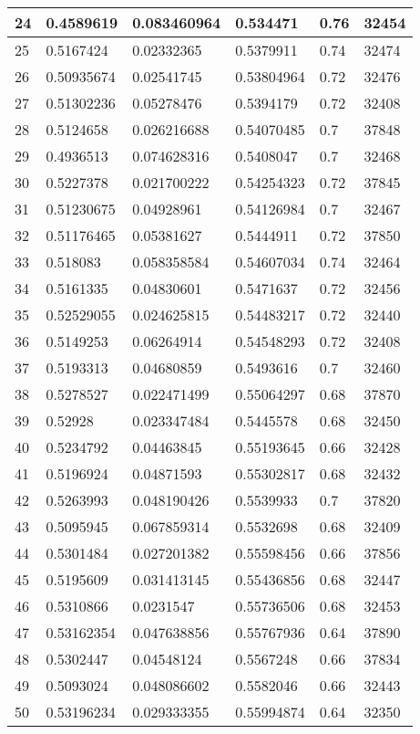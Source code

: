 \begin{longtable}{|l|l|l|l|l|l|}
24 & 0.4589619 & 0.083460964 & 0.534471 & 0.76 & 32454 \\ \hline 
25 & 0.5167424 & 0.02332365 & 0.5379911 & 0.74 & 32474 \\ \hline 
26 & 0.50935674 & 0.02541745 & 0.53804964 & 0.72 & 32476 \\ \hline 
27 & 0.51302236 & 0.05278476 & 0.5394179 & 0.72 & 32408 \\ \hline 
28 & 0.5124658 & 0.026216688 & 0.54070485 & 0.7 & 37848 \\ \hline 
29 & 0.4936513 & 0.074628316 & 0.5408047 & 0.7 & 32468 \\ \hline 
30 & 0.5227378 & 0.021700222 & 0.54254323 & 0.72 & 37845 \\ \hline 
31 & 0.51230675 & 0.04928961 & 0.54126984 & 0.7 & 32467 \\ \hline 
32 & 0.51176465 & 0.05381627 & 0.5444911 & 0.72 & 37850 \\ \hline 
33 & 0.518083 & 0.058358584 & 0.54607034 & 0.74 & 32464 \\ \hline 
34 & 0.5161335 & 0.04830601 & 0.5471637 & 0.72 & 32456 \\ \hline 
35 & 0.52529055 & 0.024625815 & 0.54483217 & 0.72 & 32440 \\ \hline 
36 & 0.5149253 & 0.06264914 & 0.54548293 & 0.72 & 32408 \\ \hline 
37 & 0.5193313 & 0.04680859 & 0.5493616 & 0.7 & 32460 \\ \hline 
38 & 0.5278527 & 0.022471499 & 0.55064297 & 0.68 & 37870 \\ \hline 
39 & 0.52928 & 0.023347484 & 0.5445578 & 0.68 & 32450 \\ \hline 
40 & 0.5234792 & 0.04463845 & 0.55193645 & 0.66 & 32428 \\ \hline 
41 & 0.5196924 & 0.04871593 & 0.55302817 & 0.68 & 32432 \\ \hline 
42 & 0.5263993 & 0.048190426 & 0.5539933 & 0.7 & 37820 \\ \hline 
43 & 0.5095945 & 0.067859314 & 0.5532698 & 0.68 & 32409 \\ \hline 
44 & 0.5301484 & 0.027201382 & 0.55598456 & 0.66 & 37856 \\ \hline 
45 & 0.5195609 & 0.031413145 & 0.55436856 & 0.68 & 32447 \\ \hline 
46 & 0.5310866 & 0.0231547 & 0.55736506 & 0.68 & 32453 \\ \hline 
47 & 0.53162354 & 0.047638856 & 0.55767936 & 0.64 & 37890 \\ \hline 
48 & 0.5302447 & 0.04548124 & 0.5567248 & 0.66 & 37834 \\ \hline 
49 & 0.5093024 & 0.048086602 & 0.5582046 & 0.66 & 32443 \\ \hline 
50 & 0.53196234 & 0.029333355 & 0.55994874 & 0.64 & 32350 \\ \hline 
\end{longtable}